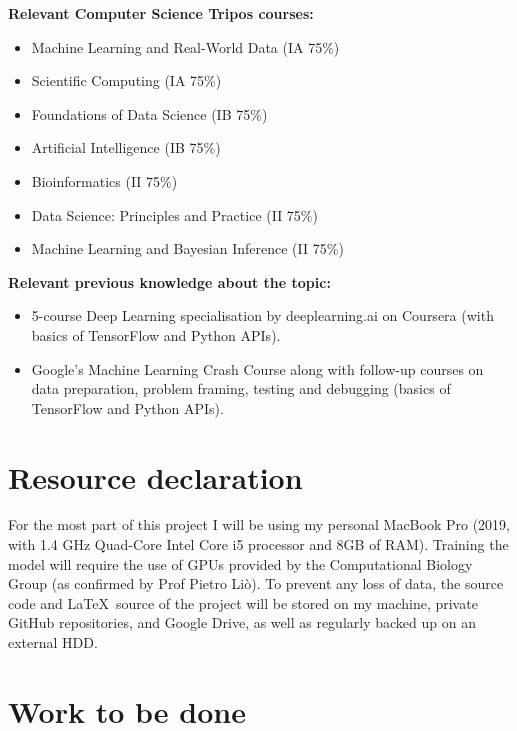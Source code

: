 \documentclass[12pt,a4paper,twoside]{article}
\begin{document}
\textbf{Relevant Computer Science Tripos courses:}
\begin{itemize}
  \item Machine Learning and Real-World Data (IA 75\%)
  \item Scientific Computing (IA 75\%)
  \item Foundations of Data Science (IB 75\%)
  \item Artificial Intelligence (IB 75\%)
  \item Bioinformatics (II 75\%)
  \item Data Science: Principles and Practice (II 75\%)
  \item Machine Learning and Bayesian Inference (II 75\%)
\end{itemize}

\textbf{Relevant previous knowledge about the topic:}
\begin{itemize}
  \item 5-course Deep Learning specialisation by deeplearning.ai on Coursera (with basics of TensorFlow and Python APIs).
  \item Google's Machine Learning Crash Course along with follow-up courses on data preparation, problem framing, testing and debugging (basics of TensorFlow and Python APIs).
\end{itemize}

\section*{Resource declaration}

For the most part of this project I will be using my personal MacBook Pro (2019, with 1.4 GHz Quad-Core Intel Core i5 processor and 8GB of RAM). Training the model will require the use of GPUs provided by the Computational Biology Group (as confirmed by Prof Pietro Liò). To prevent any loss of data, the source code and \LaTeX\ source of the project will be stored on my machine, private GitHub repositories, and Google Drive, as well as regularly backed up on an external HDD.

\section*{Work to be done}
\label{section:work}

\end{document}
